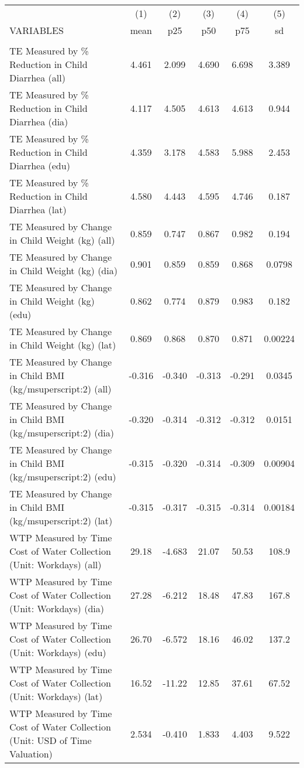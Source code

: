 \begin{tabular}{lccccc} \hline
 & (1) & (2) & (3) & (4) & (5) \\
VARIABLES & mean & p25 & p50 & p75 & sd \\ \hline
 &  &  &  &  &  \\
TE Measured by \% Reduction in Child Diarrhea (all) & 4.461 & 2.099 & 4.690 & 6.698 & 3.389 \\
TE Measured by \% Reduction in Child Diarrhea (dia) & 4.117 & 4.505 & 4.613 & 4.613 & 0.944 \\
TE Measured by \% Reduction in Child Diarrhea (edu) & 4.359 & 3.178 & 4.583 & 5.988 & 2.453 \\
TE Measured by \% Reduction in Child Diarrhea (lat) & 4.580 & 4.443 & 4.595 & 4.746 & 0.187 \\
TE Measured by Change in Child Weight (kg) (all) & 0.859 & 0.747 & 0.867 & 0.982 & 0.194 \\
TE Measured by Change in Child Weight (kg) (dia) & 0.901 & 0.859 & 0.859 & 0.868 & 0.0798 \\
TE Measured by Change in Child Weight (kg) (edu) & 0.862 & 0.774 & 0.879 & 0.983 & 0.182 \\
TE Measured by Change in Child Weight (kg) (lat) & 0.869 & 0.868 & 0.870 & 0.871 & 0.00224 \\
TE Measured by Change in Child BMI (kg/m{superscript:2)} (all) & -0.316 & -0.340 & -0.313 & -0.291 & 0.0345 \\
TE Measured by Change in Child BMI (kg/m{superscript:2)} (dia) & -0.320 & -0.314 & -0.312 & -0.312 & 0.0151 \\
TE Measured by Change in Child BMI (kg/m{superscript:2)} (edu) & -0.315 & -0.320 & -0.314 & -0.309 & 0.00904 \\
TE Measured by Change in Child BMI (kg/m{superscript:2)} (lat) & -0.315 & -0.317 & -0.315 & -0.314 & 0.00184 \\
WTP Measured by Time Cost of Water Collection (Unit: Workdays) (all) & 29.18 & -4.683 & 21.07 & 50.53 & 108.9 \\
WTP Measured by Time Cost of Water Collection (Unit: Workdays) (dia) & 27.28 & -6.212 & 18.48 & 47.83 & 167.8 \\
WTP Measured by Time Cost of Water Collection (Unit: Workdays) (edu) & 26.70 & -6.572 & 18.16 & 46.02 & 137.2 \\
WTP Measured by Time Cost of Water Collection (Unit: Workdays) (lat) & 16.52 & -11.22 & 12.85 & 37.61 & 67.52 \\
WTP Measured by Time Cost of Water Collection (Unit: USD of Time Valuation) & 2.534 & -0.410 & 1.833 & 4.403 & 9.522 \\

\end{tabular}
